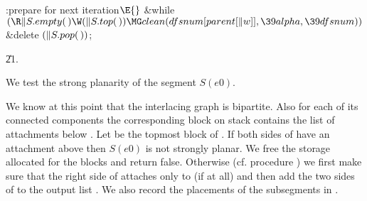 \Y\B\4:prepare for next iteration\X${}\E{}$\6
\&{while} ${}(\R\|S.\\{empty}(\,)\W(\|S.\\{top}(\,))\MG\\{clean}(\\{dfsnum}[%
\\{parent}[\|w]],\39\\{alpha},\39\\{dfsnum})){}$\1\5
\&{delete} ${}(\|S.\\{pop}(\,)){}$;\2\par
\U21.\fi

We test the strong planarity of the segment $S(e0)$.

We know at this point that the
interlacing graph is bipartite. Also for each of its connected components the
corresponding block on stack  contains the list of attachments below %
.
Let  be the topmost block of . If both sides of  have
an attachment
above  then $S(e0)$ is not strongly planar. We free the storage
allocated for
the blocks and return false. Otherwise (cf. procedure
) we first make sure that the right side of 
attaches only to 
(if at all) and then add the two sides of  to the output list . We also
record the placements of the subsegments in .

